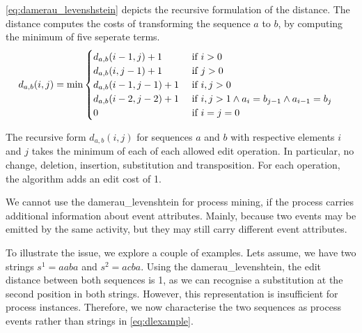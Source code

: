 \documentclass[./../../paper.tex]{subfiles}
\begin{document}
\noindent \autoref{eq:damerau_levenshstein} depicts the recursive formulation of the distance. The distance computes the costs of transforming the sequence $a$ to $b$, by computing the minimum of five seperate terms.  
\begin{align}
    \label{eq:damerau_levenshstein}
    d_{a, b}(i, j) & =\min
    \begin{cases}
        d_{a, b}(i-1, j  )+ 1 & \text { if } i>0                                            \\
        d_{a, b}(i  , j-1)+ 1 & \text { if } j>0                                            \\
        d_{a, b}(i-1, j-1)+ 1 & \text { if } i, j>0                                         \\
        d_{a, b}(i-2, j-2)+ 1 & \text { if } i, j>1 \land a_{i}=b_{j-1} \land a_{i-1}=b_{j} \\
        0                                 & \text { if } i=j=0                                         
    \end{cases}        
\end{align}

\noindent The recursive form $d_{a, b}(i, j)$ for sequences $a$ and $b$ with respective elements $i$ and $j$ takes the minimum of each of each allowed edit operation. In particular, no change, deletion, insertion, substitution and transposition. For each operation, the algorithm adds an edit cost of 1. 

We cannot use the \gls{damerau_levenshtein} for process mining, if the process carries additional information about event attributes. Mainly, because two events may be emitted by the same activity, but they may still carry different event attributes. 

To illustrate the issue, we explore a couple of examples. Lets assume, we have two strings $s^1=aaba$ and $s^2=acba$. Using the \gls{damerau_levenshtein}, the edit distance between both sequences is 1, as we can recognise a substitution at the second position in both strings. However, this representation is insufficient for process instances. Therefore, we now characterise the two sequences as process events rather than strings in \autoref{eq:dlexample}. 
\end{document}
